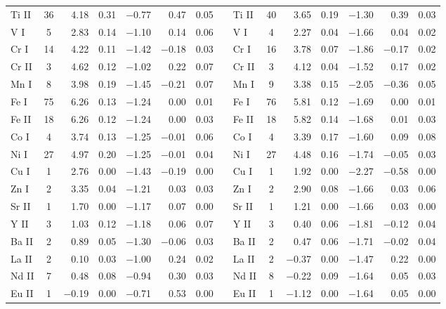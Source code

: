 \documentclass{emulateapj}
\begin{document}
\begin{longtable*}{lcrcrrcclcrcrrc}
 Ti \textsc{II} &  36 &    4.18 &    0.31 & $-$0.77 &    0.47 &    0.05 &&
 Ti \textsc{II} &  40 &    3.65 &    0.19 & $-$1.30 &    0.39 &    0.03 \\
   V \textsc{I} &   5 &    2.83 &    0.14 & $-$1.10 &    0.14 &    0.06 &&
   V \textsc{I} &   4 &    2.27 &    0.04 & $-$1.66 &    0.04 &    0.02 \\
  Cr \textsc{I} &  14 &    4.22 &    0.11 & $-$1.42 & $-$0.18 &    0.03 &&
  Cr \textsc{I} &  16 &    3.78 &    0.07 & $-$1.86 & $-$0.17 &    0.02 \\
 Cr \textsc{II} &   3 &    4.62 &    0.12 & $-$1.02 &    0.22 &    0.07 &&
 Cr \textsc{II} &   3 &    4.12 &    0.04 & $-$1.52 &    0.17 &    0.02 \\
  Mn \textsc{I} &   8 &    3.98 &    0.19 & $-$1.45 & $-$0.21 &    0.07 &&
  Mn \textsc{I} &   9 &    3.38 &    0.15 & $-$2.05 & $-$0.36 &    0.05 \\
  Fe \textsc{I} &  75 &    6.26 &    0.13 & $-$1.24 &    0.00 &    0.01 &&
  Fe \textsc{I} &  76 &    5.81 &    0.12 & $-$1.69 &    0.00 &    0.01 \\
 Fe \textsc{II} &  18 &    6.26 &    0.12 & $-$1.24 &    0.00 &    0.03 &&
 Fe \textsc{II} &  18 &    5.82 &    0.14 & $-$1.68 &    0.01 &    0.03 \\
  Co \textsc{I} &   4 &    3.74 &    0.13 & $-$1.25 & $-$0.01 &    0.06 &&
  Co \textsc{I} &   4 &    3.39 &    0.17 & $-$1.60 &    0.09 &    0.08 \\
  Ni \textsc{I} &  27 &    4.97 &    0.20 & $-$1.25 & $-$0.01 &    0.04 &&
  Ni \textsc{I} &  27 &    4.48 &    0.16 & $-$1.74 & $-$0.05 &    0.03 \\
  Cu \textsc{I} &   1 &    2.76 &    0.00 & $-$1.43 & $-$0.19 &    0.00 &&
  Cu \textsc{I} &   1 &    1.92 &    0.00 & $-$2.27 & $-$0.58 &    0.00 \\
  Zn \textsc{I} &   2 &    3.35 &    0.04 & $-$1.21 &    0.03 &    0.03 &&
  Zn \textsc{I} &   2 &    2.90 &    0.08 & $-$1.66 &    0.03 &    0.06 \\
 Sr \textsc{II} &   1 &    1.70 &    0.00 & $-$1.17 &    0.07 &    0.00 &&
 Sr \textsc{II} &   1 &    1.21 &    0.00 & $-$1.66 &    0.03 &    0.00 \\
  Y \textsc{II} &   3 &    1.03 &    0.12 & $-$1.18 &    0.06 &    0.07 &&
  Y \textsc{II} &   3 &    0.40 &    0.06 & $-$1.81 & $-$0.12 &    0.04 \\
 Ba \textsc{II} &   2 &    0.89 &    0.05 & $-$1.30 & $-$0.06 &    0.03 &&
 Ba \textsc{II} &   2 &    0.47 &    0.06 & $-$1.71 & $-$0.02 &    0.04 \\
 La \textsc{II} &   2 &    0.10 &    0.03 & $-$1.00 &    0.24 &    0.02 &&
 La \textsc{II} &   2 & $-$0.37 &    0.00 & $-$1.47 &    0.22 &    0.00 \\
 Nd \textsc{II} &   7 &    0.48 &    0.08 & $-$0.94 &    0.30 &    0.03 &&
 Nd \textsc{II} &   8 & $-$0.22 &    0.09 & $-$1.64 &    0.05 &    0.03 \\
 Eu \textsc{II} &   1 & $-$0.19 &    0.00 & $-$0.71 &    0.53 &    0.00 &&
 Eu \textsc{II} &   1 & $-$1.12 &    0.00 & $-$1.64 &    0.05 &    0.00 \\



\end{longtable*}
\end{document}
